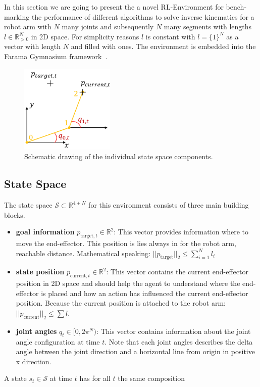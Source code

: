In this section we are going to present the a novel RL-Environment for bench-marking the performance of different algorithms to solve inverse kinematics for a robot arm with $N$ many joints and subsequently $N$ many segments with lengths $l \in\mathbb{R}_{>0}^N$ in 2D space. For simplicity reasons $l$ is constant with $l = \{1\}^N$ as a vector with length $N$ and filled with ones. The environment is embedded into the Farama Gymnasium framework~\cite{Gymnasium}.

\begin{figure}[h]
	\centering
	\includegraphics[width=0.4\textwidth,]{figures/methodology/EnvExample.png}
	\caption[Plane Robot Environment]{Schematic drawing of the individual state space components.}
	\label{fig:plane_robot_env}
\end{figure}

\subsection{State Space}

The state space $\mathcal{S} \subset \mathbb{R}^{4 + N}$ for this environment consists of three main building blocks. 

\begin{itemize}
    \item \textbf{goal information} $p_{\text{target}, t} \in \mathbb{R}^2$: This vector provides information where to move the end-effector. This position is lies always in for the robot arm, reachable distance. Mathematical speaking: $||p_\text{target}||_2 \leq \sum_{i = 1}^N l_i$ 
    \item \textbf{state position} $p_{\text{current},t} \in \mathbb{R}^2$: This vector contains the current end-effector position in 2D space and should help the agent to understand where the end-effector is placed and how an action has influenced the current end-effector position. Because the current position is attached to the robot arm: $||p_\text{current}||_2 \leq \sum l$.
    \item \textbf{joint angles} $q_t \in [0, 2\pi^N)$: This vector contains information about the joint angle configuration at time $t$. Note that each joint angles describes the delta angle between the joint direction and a horizontal line from origin in positive x direction.
\end{itemize}
A state $s_t \in \mathcal{S}$ at time $t$ has for all $t$ the same composition

